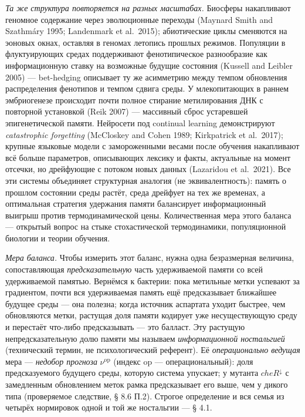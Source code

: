 \documentclass[pdflatex,sn-mathphys-ay]{sn-jnl}
\begin{document}
\emph{Та же структура повторяется на разных масштабах.} Биосферы накапливают геномное содержание через эволюционные переходы (Maynard Smith and Szathmáry 1995; Landenmark et al.~2015); абиотические циклы сменяются на эоновых окнах, оставляя в геномах летопись прошлых режимов. Популяции в флуктуирующих средах поддерживают фенотипическое разнообразие как информационную ставку на возможные будущие состояния (Kussell and Leibler 2005) --- bet-hedging описывает ту же асимметрию между темпом обновления распределения фенотипов и темпом сдвига среды. У млекопитающих в раннем эмбриогенезе происходит почти полное стирание метилирования ДНК с повторной установкой (Reik 2007) --- массивный сброс устаревшей эпигенетической памяти. Нейросети под continual learning демонстрируют \emph{catastrophic forgetting} (McCloskey and Cohen 1989; Kirkpatrick et al.~2017); крупные языковые модели с замороженными весами после обучения накапливают всё больше параметров, описывающих лексику и факты, актуальные на момент отсечки, но дрейфующие с потоком новых данных (Lazaridou et al.~2021). Все эти системы объединяет структурная аналогия (не эквивалентность): память о прошлом состоянии среды растёт, среда дрейфует на тех же временах, а оптимальная стратегия удержания памяти балансирует информационный выигрыш против термодинамической цены. Количественная мера этого баланса --- открытый вопрос на стыке стохастической термодинамики, популяционной биологии и теории обучения.



\emph{Мера баланса.} Чтобы измерить этот баланс, нужна одна безразмерная величина, сопоставляющая \emph{предсказательную} часть удерживаемой памяти со всей удерживаемой памятью. Вернёмся к бактерии: пока метильные метки успевают за градиентом, почти вся удерживаемая память ещё предсказывает ближайшее будущее среды --- она полезна; когда источник аспартата уходит быстрее, чем обновляются метки, растущая доля памяти кодирует уже несуществующую среду и перестаёт что-либо предсказывать --- это балласт. Эту растущую непредсказательную долю памяти мы называем \emph{информационной ностальгией} (технический термин, не психологический референт). Её \emph{операционально ведущая} мера --- \emph{недобор прогноза} \(\nu^{\text{op}}\) (индекс op --- операциональный): доля предсказуемого будущего среды, которую система упускает; у мутанта \(cheR^{\downarrow}\) с замедленным обновлением меток рамка предсказывает его выше, чем у дикого типа (проверяемое следствие, § 8.6 П.2). Строгое определение и вся семья из четырёх нормировок одной и той же ностальгии --- § 4.1.
\end{document}
